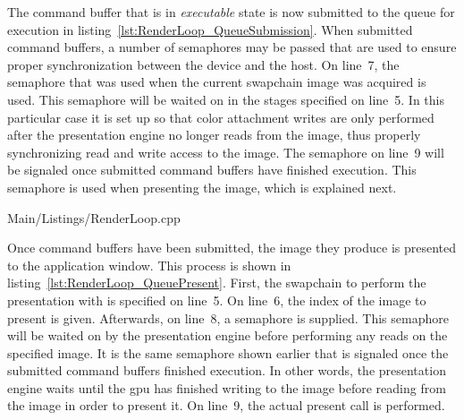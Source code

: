     The command buffer that is in \textit{executable} state is now submitted to the queue for execution in listing~\ref{lst:RenderLoop_QueueSubmission}.
    When submitted command buffers, a number of semaphores may be passed that are used to ensure proper synchronization between the device and the host.
    On line~7, the semaphore that was used when the current swapchain image was acquired is used.
    This semaphore will be waited on in the stages specified on line~5.
    In this particular case it is set up so that color attachment writes are only performed after the presentation engine no longer reads from the image, thus properly synchronizing read and write access to the image.
    The semaphore on line~9 will be signaled once submitted command buffers have finished execution.
    This semaphore is used when presenting the image, which is explained next.



    
    {Main/Listings/RenderLoop.cpp}

    Once command buffers have been submitted, the image they produce is presented to the application window.
    This process is shown in listing~\ref{lst:RenderLoop_QueuePresent}.
    First, the swapchain to perform the presentation with is specified on line~5.
    On line~6, the index of the image to present is given.
    Afterwards, on line~8, a semaphore is supplied.
    This semaphore will be waited on by the presentation engine before performing any reads on the specified image.
    It is the same semaphore shown earlier that is signaled once the submitted command buffers finished execution.
    In other words, the presentation engine waits until the \gls{gpu} has finished writing to the image before reading from the image in order to present it.
    On line~9, the actual present call is performed.





